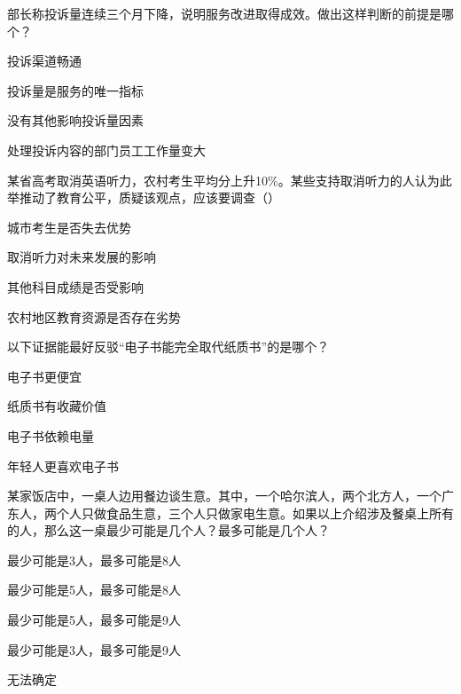 \documentclass{exam-zh}
\begin{document}
\begin{question}
部长称投诉量连续三个月下降，说明服务改进取得成效。做出这样判断的前提是哪个？ \paren[]
\begin{choices}
  \item 投诉渠道畅通
  \item 投诉量是服务的唯一指标
  \item 没有其他影响投诉量因素
  \item 处理投诉内容的部门员工工作量变大
\end{choices}
\end{question}

\begin{question}
某省高考取消英语听力，农村考生平均分上升10\%。某些支持取消听力的人认为此举推动了教育公平，质疑该观点，应该要调查（）\paren[]
\begin{choices}
  \item 城市考生是否失去优势
  \item 取消听力对未来发展的影响
  \item 其他科目成绩是否受影响
  \item 农村地区教育资源是否存在劣势
\end{choices}
\end{question}

\begin{question}
以下证据能最好反驳“电子书能完全取代纸质书”的是哪个？ \paren[]
\begin{choices}
  \item 电子书更便宜
  \item 纸质书有收藏价值
  \item 电子书依赖电量
  \item 年轻人更喜欢电子书
\end{choices}
\end{question}

\begin{question}
某家饭店中，一桌人边用餐边谈生意。其中，一个哈尔滨人，两个北方人，一个广东人，两个人只做食品生意，三个人只做家电生意。如果以上介绍涉及餐桌上所有的人，那么这一桌最少可能是几个人？最多可能是几个人？ \paren[]
\begin{choices}
  \item 最少可能是3人，最多可能是8人
  \item 最少可能是5人，最多可能是8人
  \item 最少可能是5人，最多可能是9人
  \item 最少可能是3人，最多可能是9人
  \item 无法确定
\end{choices}
\end{question}
\end{document}
